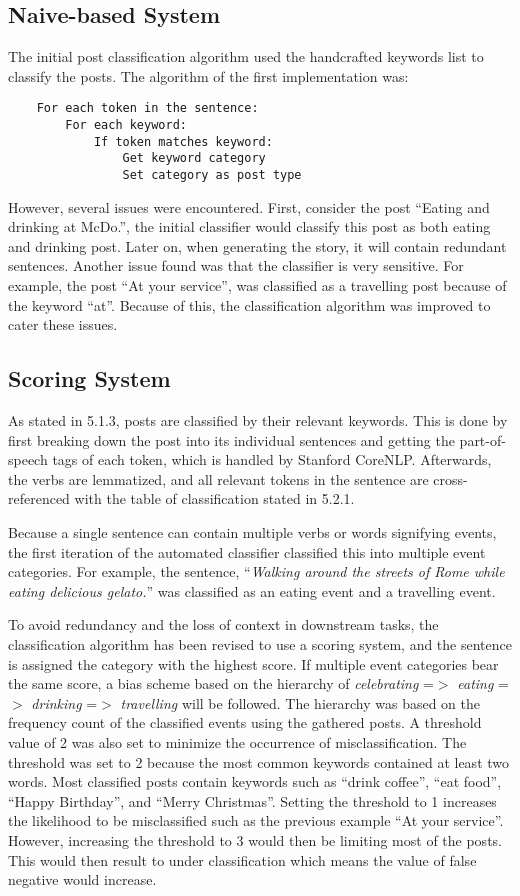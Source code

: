 \subsection{Naive-based System}
The initial post classification algorithm used the handcrafted keywords list to classify the posts. The algorithm of the first implementation was:
\begin{lstlisting}
	For each token in the sentence:
		For each keyword:
			If token matches keyword:
				Get keyword category
				Set category as post type
\end{lstlisting}

However, several issues were encountered. First, consider the post ``Eating and drinking at McDo.'', the initial classifier would classify this post as both eating and drinking post. Later on, when generating the story, it will contain redundant sentences. Another issue found was that the classifier is very sensitive. For example, the post ``At your service'', was classified as a travelling post because of the keyword ``at''. Because of this, the classification algorithm was improved to cater these issues.

\subsection{Scoring System}
As stated in 5.1.3, posts are classified by their relevant keywords. This is done by first breaking down the post into its individual sentences and getting the part-of-speech tags of each token, which is handled by Stanford CoreNLP. Afterwards, the verbs are lemmatized, and all relevant tokens in the sentence are cross-referenced with the table of classification stated in 5.2.1.

Because a single sentence can contain multiple verbs or words signifying events, the first iteration of the automated classifier classified this into multiple event categories. For example, the sentence, ``\textit{Walking around the streets of Rome while eating delicious gelato.}'' was classified as an eating event and a travelling event. 

To avoid redundancy and the loss of context in downstream tasks, the classification algorithm has been revised to use a scoring system, and the sentence is assigned the category with the highest score. If multiple event categories bear the same score, a bias scheme based on the hierarchy of \textit{celebrating} =$>$ \textit{eating} =$>$ \textit{drinking} =$>$ \textit{travelling} will be followed. The hierarchy was based on the frequency count of the classified events using the gathered posts. A threshold value of 2 was also set to minimize the occurrence of misclassification. The threshold was set to 2 because the most common keywords contained at least two words. Most classified posts contain keywords such as ``drink coffee'', ``eat food'', ``Happy Birthday'', and ``Merry Christmas''. Setting the threshold to 1 increases the likelihood to be misclassified such as the previous example ``At your service''. However, increasing the threshold to 3 would then be limiting most of the posts. This would then result to under classification which means the value of false negative would increase.

